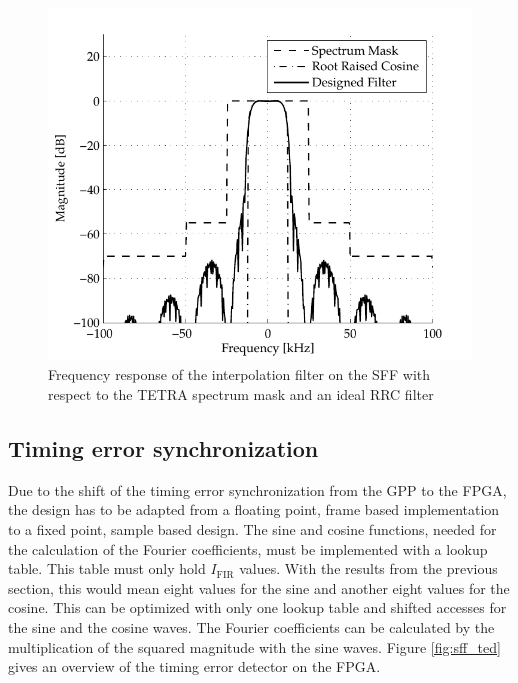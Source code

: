 \begin{figure}[htb]
	\centering
		\includegraphics[width=1.00\textwidth]{../kapitel04/figures/tetra_sff_resampling.pdf}
	\caption{Frequency response of the interpolation filter on the SFF with respect to the TETRA spectrum mask and an ideal RRC filter}
	\label{fig:tetra_sff_resampling}
\end{figure}


\subsection{Timing error synchronization}
Due to the shift of the timing error synchronization from the GPP to the FPGA, the design has to be adapted from a floating point, frame based implementation to a fixed point, sample based design. The sine and cosine functions, needed for the calculation of the Fourier coefficients, must be implemented with a lookup table. This table must only hold $I_\text{FIR}$ values. With the results from the previous section, this would mean eight values for the sine and another eight values for the cosine. This can be optimized with only one lookup table and shifted accesses for the sine and the cosine waves. The Fourier coefficients can be calculated by the multiplication of the squared magnitude with the sine waves. Figure \ref{fig:sff_ted} gives an overview of the timing error detector on the FPGA. 

